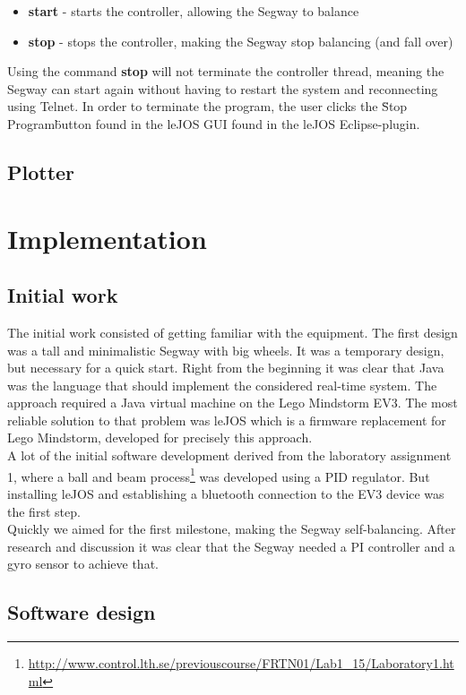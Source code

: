 \begin{itemize}
\item \textbf{start} - starts the controller, allowing the Segway to balance
\item \textbf{stop} - stops the controller, making the Segway stop balancing (and fall over)
\end{itemize}

\noindent Using the command \textbf{stop} will not terminate the controller thread, meaning the Segway can start again without having to restart the system and reconnecting using Telnet. In order to terminate the program, the user clicks the \"Stop Program\" button found in the leJOS GUI found in the leJOS Eclipse-plugin.

\subsection{Plotter}
  
\section{Implementation}
\subsection{Initial work}
The initial work consisted of getting familiar with the equipment. The first design was a tall and minimalistic Segway with big wheels. It was a temporary design, but necessary for a quick start. Right from the beginning it was clear that Java was the language that should implement the considered real-time system. The approach required a Java virtual machine on the Lego Mindstorm EV3. The most reliable solution to that problem was leJOS which is a firmware replacement for Lego Mindstorm, developed for precisely this approach. 
\\[3ex]
A lot of the initial software development derived from the laboratory assignment 1, where a ball and beam process\footnote{\url{http://www.control.lth.se/previouscourse/FRTN01/Lab1_15/Laboratory1.html}} was developed using a PID regulator. But installing leJOS and establishing a bluetooth connection to the EV3 device was the first step. 
\\[3ex]
Quickly we aimed for the first milestone, making the Segway self-balancing. After research and discussion it was clear that the Segway needed a PI controller and a gyro sensor to achieve that. 

\subsection{Software design}

